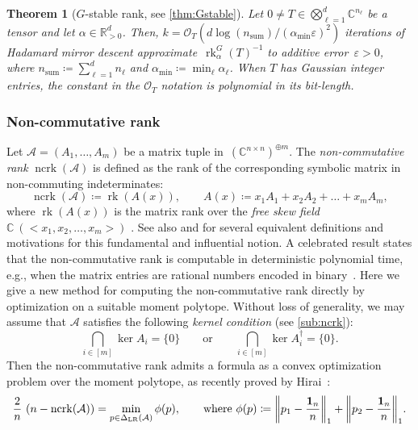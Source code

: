 \documentclass[11pt,letterpaper]{article}
\newtheorem{theorem}{Theorem}[section]
\numberwithin{equation}{section}
\newcommand{\eps}{\varepsilon}
\newcommand{\op}{\oplus}
\newcommand{\RR}{\mathbb{R}}
\newcommand{\CC}{\mathbb{C}}
\DeclareMathOperator{\rk}{rk}
\DeclareMathOperator{\ncrk}{ncrk}
\DeclareMathOperator{\Sum}{sum}
\DeclarePairedDelimiter\norm{\lVert}{\rVert}
\begin{document}
\begin{theorem}[$G$-stable rank, see \cref{thm:Gstable}]
    Let $0\neq T\in \bigotimes_{\ell=1}^d \CC^{n_\ell}$ be a tensor and let $\alpha \in \RR^d_{>0}$.
    Then, $k = \mathcal O_T(d \log(n_{\Sum}) /(\alpha_{\min}\varepsilon)^2)$ iterations of Hadamard mirror descent approximate~$\rk_\alpha^G(T)^{-1}$ to additive error~$\eps>0$,
    where $n_{\Sum} \coloneqq \sum_{\ell=1}^d n_\ell$ and $\alpha_{\min} \coloneqq \min_\ell \alpha_\ell$.
When $T$ has Gaussian integer entries, the constant in the $\mathcal O_T$ notation is polynomial in its bit-length.
\end{theorem}


\subsubsection{Non-commutative rank}
Let $\mathcal A = (A_1,\dots,A_m)$ be a matrix tuple in~$(\CC^{n \times n})^{\op m}$.
The \emph{non-commutative rank} $\ncrk(\mathcal{A})$ is defined as the rank of the corresponding symbolic matrix in non-commuting indeterminates:
\[
    \ncrk(\mathcal{A}) \coloneqq \rk(A(x)), \qquad A(x) \coloneqq x_1 A_1 + x_2 A_2 +\dots + x_m A_m,
\]
where $\rk(A(x))$ is the matrix rank over the \emph{free skew field} $\CC\ (\!\!\!\!<\!\!x_1,x_2,\dots,x_m\!\!>\!\!\!\!)$ \cite{Cohn1995}.
See also \cite[Thm.~1.17]{GGOW20} and \cite[Def.~2.1]{FSG-22} for several equivalent definitions and motivations for this fundamental and influential notion.
A celebrated result states that the non-commutative rank is computable in deterministic polynomial time, e.g., when the matrix entries are rational numbers encoded in binary~\cite{GGOW20,IQS-18,Hamada-Hirai-21}.
Here we give a new method for computing the non-commutative rank directly by optimization on a suitable moment polytope.
%
Without loss of generality, we may assume that $\mathcal{A}$ satisfies the following \emph{kernel condition} (see \cref{sub:ncrk}):
\begin{equation}\label{eq:kernel-condition-intro}
    \bigcap_{i \in [m]}\ker A_i = \{0\} \qquad\text{or}\qquad \bigcap_{i \in [m]}\ker A^\dagger_i = \{0\}.
\end{equation}
Then the non-commutative rank admits a formula as a convex optimization problem over the moment polytope, as recently proved by Hirai~\cite{Hirai2025,Hirai-ncrank}:
\[
\frac{2}{n}\, \left(n-\ncrk(\mathcal{A})\right) = \min_{p\in\Delta_{\mathrm{LR}}(\mathcal{A})} \phi(p),\qquad \text{where}\  \phi(p)\coloneqq\norm*{p_1 - \frac{\mathbf{1}_n}{n}}_1 + \norm*{p_2 - \frac{\mathbf{1}_n}{n}}_1.
\]
\end{document}
